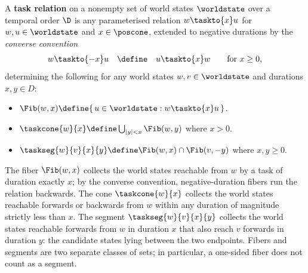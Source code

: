 \documentclass[../BimodalReference.tex]{subfiles}
\begin{document}
\begin{definition}\label{def:task-relation}
A \textbf{task relation} on a nonempty set of world states $\worldstate$ over a temporal order $\D$ is any parameterised relation $w \taskto{x} u$ for $w, u \in \worldstate$ and $x \in \poscone$, extended to negative durations by the \emph{converse convention}
\[
  w \taskto{-x} u \quad \define \quad u \taskto{x} w
  \qquad \text{for } x \geq 0,
\]
determining the following for any world states $w, v \in \worldstate$ and durations $x, y \in D$:
\begin{itemize}
  \item[\emph{Fiber}:] $\Fib(w, x) \define \{\, u \in \worldstate : w \taskto{x} u \,\}$.
  \item[\emph{Cone}:] $\taskcone{w}{x} \define \bigcup_{|y| < x} \Fib(w, y)$ where $x > 0$.
  \item[\emph{Segment}:] $\taskseg{w}{v}{x}{y} \define \Fib(w, x) \cap \Fib(v, -y)$ where $x, y \geq 0$.
\end{itemize}
\end{definition}

\noindent
The fiber $\Fib(w, x)$ collects the world states reachable from $w$ by a task of duration exactly $x$; by the converse convention, negative-duration fibers run the relation backwards.
The cone $\taskcone{w}{x}$ collects the world states reachable forwards or backwards from $w$ within any duration of magnitude strictly less than $x$.
The segment $\taskseg{w}{v}{x}{y}$ collects the world states reachable forwards from $w$ in duration $x$ that also reach $v$ forwards in duration $y$: the candidate states lying between the two endpoints.
Fibers and segments are two separate classes of sets; in particular, a one-sided fiber does not count as a segment.
\end{document}
